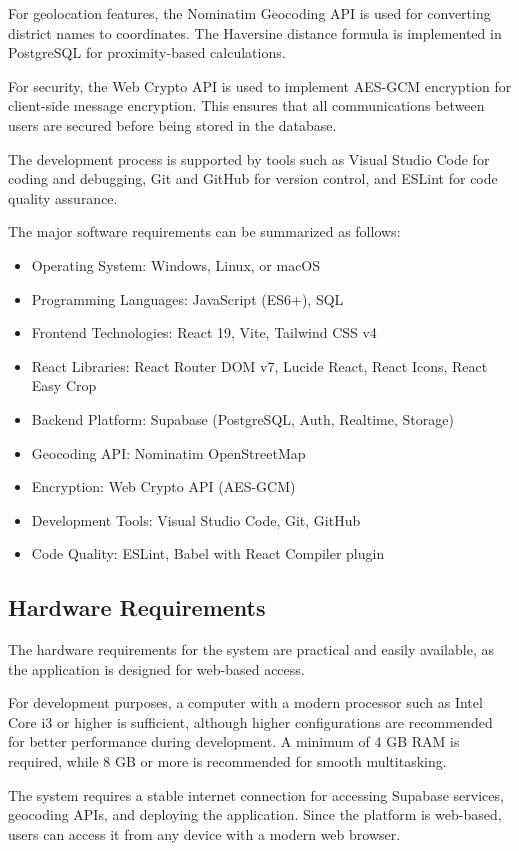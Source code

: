 \documentclass[12pt,a4paper]{report}
\begin{document}
For geolocation features, the Nominatim Geocoding API is used for converting district names to coordinates. The Haversine distance formula is implemented in PostgreSQL for proximity-based calculations.

For security, the Web Crypto API is used to implement AES-GCM encryption for client-side message encryption. This ensures that all communications between users are secured before being stored in the database.

The development process is supported by tools such as Visual Studio Code for coding and debugging, Git and GitHub for version control, and ESLint for code quality assurance.

The major software requirements can be summarized as follows:

\begin{itemize}
\item Operating System: Windows, Linux, or macOS
\item Programming Languages: JavaScript (ES6+), SQL
\item Frontend Technologies: React 19, Vite, Tailwind CSS v4
\item React Libraries: React Router DOM v7, Lucide React, React Icons, React Easy Crop
\item Backend Platform: Supabase (PostgreSQL, Auth, Realtime, Storage)
\item Geocoding API: Nominatim OpenStreetMap
\item Encryption: Web Crypto API (AES-GCM)
\item Development Tools: Visual Studio Code, Git, GitHub
\item Code Quality: ESLint, Babel with React Compiler plugin
\end{itemize}

\subsection{Hardware Requirements}

The hardware requirements for the system are practical and easily available, as the application is designed for web-based access.

For development purposes, a computer with a modern processor such as Intel Core i3 or higher is sufficient, although higher configurations are recommended for better performance during development. A minimum of 4 GB RAM is required, while 8 GB or more is recommended for smooth multitasking.

The system requires a stable internet connection for accessing Supabase services, geocoding APIs, and deploying the application. Since the platform is web-based, users can access it from any device with a modern web browser.
\end{document}
